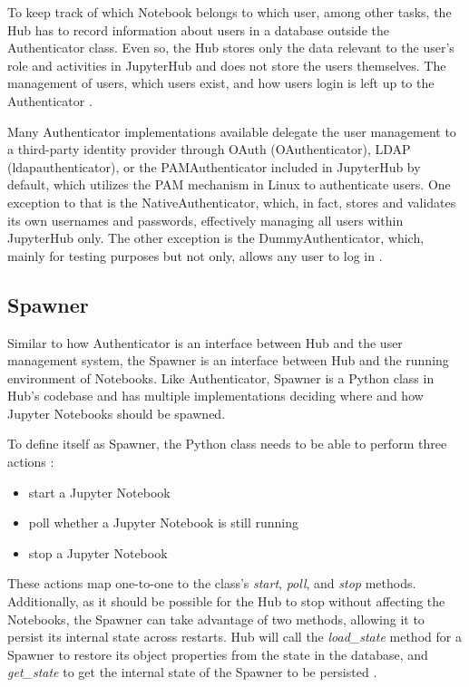 \documentclass[
  digital,     %
  oneside,     %
  nosansbold,  %
  nocolorbold, %
  lof,         %
  lot,         %
]{fithesis4}
\begin{document}
To keep track of which Notebook belongs to which user, among other tasks, the Hub has to record information about users in a database outside the Authenticator class. Even so, the Hub stores only the data relevant to the user's role and activities in JupyterHub and does not store the users themselves. The management of users, which users exist, and how users login is left up to the Authenticator \cite{jupyterhub_arch}.

Many Authenticator implementations available delegate the user management to a third-party identity provider through OAuth (OAuthenticator), LDAP (ldapauthenticator), or the PAMAuthenticator included in JupyterHub by default, which utilizes the PAM mechanism in Linux to authenticate users. One exception to that is the NativeAuthenticator, which, in fact, stores and validates its own usernames and passwords, effectively managing all users within JupyterHub only. The other exception is the DummyAuthenticator, which, mainly for testing purposes but not only, allows any user to log in \cite{jupyterhub_arch}.

\subsection{Spawner}
Similar to how Authenticator is an interface between Hub and the user management system, the Spawner is an interface between Hub and the running environment of Notebooks. Like Authenticator, Spawner is a Python class in Hub's codebase and has multiple implementations deciding where and how Jupyter Notebooks should be spawned. 

To define itself as Spawner, the Python class needs to be able to perform three actions \cite{jupyterhub_spawner}:
\begin{itemize}
  \item start a Jupyter Notebook
  \item poll whether a Jupyter Notebook is still running
  \item stop a Jupyter Notebook
\end{itemize}
These actions map one-to-one to the class's \emph{start}, \emph{poll}, and \emph{stop} methods. Additionally, as it should be possible for the Hub to stop without affecting the Notebooks, the Spawner can take advantage of two methods, allowing it to persist its internal state across restarts. Hub will call the \emph{load\_state} method for a Spawner to restore its object properties from the state in the database, and \emph{get\_state} to get the internal state of the Spawner to be persisted \cite{jupyterhub_spawner}.
\end{document}
